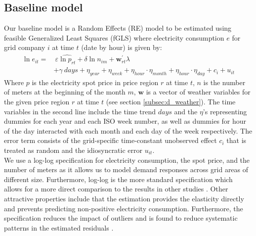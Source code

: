 \label{sec:empirical}
\subsection{Baseline model}
\label{subsec:e_model}
Our baseline model is a Random Effects (RE) model to be estimated using feasible Generalized Least Squares (fGLS) where electricity consumption $e$ for grid company $i$ at time $t$ (date by hour) is given by:
\begin{equation}
  \label{eq:baseline}
  \begin{split}
  \ln e_{it}=&\ \varepsilon \widehat{\ln p_{rt}}+\delta\ln n_{im}+\bm{w}^{'}_{rt}\lambda\\
  &+\gamma\ days+\eta_{year}+\eta_{week}+\eta_{hour}\cdot\eta_{month}+\eta_{hour}\cdot\eta_{day}+c_i+u_{it}
  \end{split}
\end{equation}
Where $p$ is the electricity spot price in price region $r$ at time $t$, $n$ is the number of meters at the beginning of the month $m$, $\bm{w}$ is a vector of weather variables for the given price region $r$ at time $t$ (see section \ref{subsec:d_weather}). The time variables in the second line include the time trend $days$ and the $\eta$'s representing dummies for each year and each ISO week number, as well as dummies for hour of the day interacted with each month and each day of the week respectively. The error term consists of the grid-specific time-constant unobserved effect $c_i$ that is treated as random and the idiosyncratic error $u_{it}$.
\medskip\\
We use a log-log specification for electricity consumption, the spot price, and the number of meters as it allows us to model demand responses across grid areas of different size. Furthermore, log-log is the more standard specification which allows for a more direct comparison to the results in other studies \citep{burke2017price}. Other attractive properties include that the estimation provides the elasticity directly and prevents predicting non-positive electricity consumption. Furthermore, the specification reduces the impact of outliers and is found to reduce systematic patterns in the estimated residuals \citep{burke2017price}.


